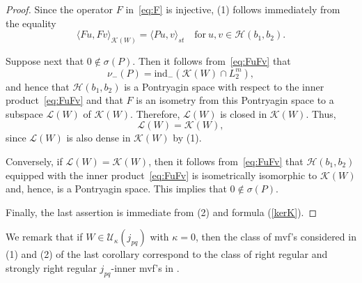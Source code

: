 \documentclass[12pt,twoside,a4paper]{amsart}
\theoremstyle{definition}
\numberwithin{equation}{section}
\begin{document}
\begin{proof}
Since the operator $F$ in~\eqref{eq:F} is injective, (1) follows immediately
from the equality
\begin{equation}\label{eq:FuFv}
    \langle Fu,Fv\rangle_{{{\mathcal K}}(W)}=\langle Pu,v\rangle_{st} \quad
\textrm{for}\ u,v\in {{\mathcal H}}(b_1,b_2).
\end{equation}

Suppose next that  $0\not\in\sigma(P)$. Then it follows from~\eqref{eq:FuFv}
that
\[
\nu_-(P)=\mbox{ind}_-({{\mathcal K}}(W)\cap L_2^m),
\]
and hence that ${{\mathcal H}}(b_1,b_2)$ is a
Pontryagin space with respect to the inner product~\eqref{eq:FuFv} and that
$F$ is an isometry from this  Pontryagin space to a subspace ${{\mathcal L}}(W)$ of
${{\mathcal K}}(W)$. Therefore, ${{\mathcal L}}(W)$ is closed in ${{\mathcal K}}(W)$. Thus,
\[
{{\mathcal L}}(W)={{\mathcal K}}(W),
\]
since ${{\mathcal L}}(W)$ is also dense in ${{\mathcal K}}(W)$ by (1).

Conversely, if ${{\mathcal L}}(W)={{\mathcal K}}(W)$, then it follows from~\eqref{eq:FuFv}
that ${{\mathcal H}}(b_1,b_2)$ equipped with the inner product~\eqref{eq:FuFv} is
isometrically isomorphic to ${{\mathcal K}}(W)$ and, hence, is a Pontryagin space. This
implies that $0\not\in\sigma(P)$.

Finally, the last assertion is immediate from (2) and formula (\ref{kerK}).
\end{proof}

We remark that if $W\in{{\mathcal U}}_\kappa(j_{pq})$ with $\kappa=0$, then the class of
mvf's considered in (1) and (2) of the last corollary correspond to the
class of right regular and strongly right regular $j_{pq}$-inner mvf's
in \cite{ArovD08}.
\end{document}
